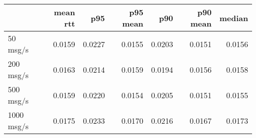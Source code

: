 \begin{tabular}{l|rrrrrr}
\rowcolor{gray!50}
 & mean rtt & p95 & p95 mean & p90 & p90 mean & median\\\hline
50 msg/s & 0.0159 & 0.0227 & 0.0155 & 0.0203 & 0.0151 & 0.0156 \\
200 msg/s & 0.0163 & 0.0214 & 0.0159 & 0.0194 & 0.0156 & 0.0158 \\
500 msg/s & 0.0159 & 0.0220 & 0.0154 & 0.0205 & 0.0151 & 0.0155 \\
1000 msg/s & 0.0175 & 0.0233 & 0.0170 & 0.0216 & 0.0167 & 0.0173 \\
\end{tabular}
